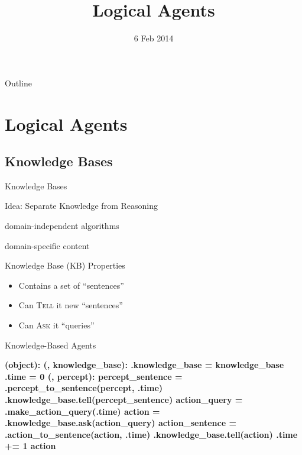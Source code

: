 \documentclass[14pt]{beamer}
\title{Logical Agents}
\date{6 Feb 2014}
\begin{document}
\begin{frame}
  \titlepage
\end{frame}


\begin{frame}{Outline}
  \tableofcontents
\end{frame}


\section{Logical Agents}
\subsection{Knowledge Bases}
\begin{frame}{Knowledge Bases}
\begin{block}{Idea: Separate Knowledge from Reasoning}
\begin{description}
\item[Inference Engine:] domain-independent algorithms
\item[Knowledge Base:] domain-specific content
\end{description}
\end{block}
\pause
\begin{block}{Knowledge Base (KB) Properties}
\begin{itemize}
\item Contains a set of ``sentences''
\item Can \textsc{Tell} it new ``sentences''
\item Can \textsc{Ask} it ``queries''
\end{itemize}
\end{block}
\end{frame}
\begin{frame}[fragile]{Knowledge-Based Agents}
	\begin{semiverbatim}\bfseries\scriptsize
		 (object):\pause
		     (, knowledge_base):
		        .knowledge_base = knowledge_base
		        .time = 0
		     (, percept):
		        \pause{}
		        percept_sentence = .percept_to_sentence(percept, .time)
		        .knowledge_base.tell(percept_sentence)
		        \pause{}
		        action_query = .make_action_query(.time)
		        action = .knowledge_base.ask(action_query)
		        \pause{}
		        action_sentence = .action_to_sentence(action, .time)
		        .knowledge_base.tell(action)
		        .time += 1
		        \pause{}
		         action
	\end{semiverbatim}
\end{frame}
\end{document}
